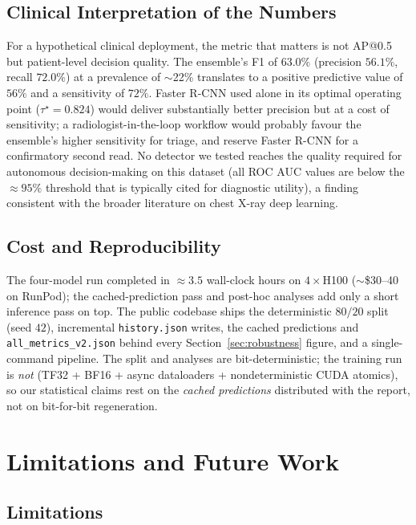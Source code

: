 \documentclass[11pt,a4paper]{article}
\begin{document}
\subsection{Clinical Interpretation of the Numbers}
For a hypothetical clinical deployment, the metric that matters is not AP@0.5 but patient-level decision quality. The ensemble's F1 of $63.0\%$ (precision $56.1\%$, recall $72.0\%$) at a prevalence of $\sim$22\% translates to a positive predictive value of $56\%$ and a sensitivity of $72\%$. Faster R-CNN used alone in its optimal operating point ($\tau^\star = 0.824$) would deliver substantially better precision but at a cost of sensitivity; a radiologist-in-the-loop workflow would probably favour the ensemble's higher sensitivity for triage, and reserve Faster R-CNN for a confirmatory second read. No detector we tested reaches the quality required for autonomous decision-making on this dataset (all ROC AUC values are below the $\approx 95\%$ threshold that is typically cited for diagnostic utility), a finding consistent with the broader literature on chest X-ray deep learning.

\subsection{Cost and Reproducibility}
The four-model run completed in $\approx 3.5$ wall-clock hours on $4\!\times\!$H100 ($\sim$\$30--40 on RunPod); the cached-prediction pass and post-hoc analyses add only a short inference pass on top. The public codebase ships the deterministic $80/20$ split (seed $42$), incremental \texttt{history.json} writes, the cached predictions and \texttt{all\_metrics\_v2.json} behind every Section~\ref{sec:robustness} figure, and a single-command pipeline. The split and analyses are bit-deterministic; the training run is \emph{not} (TF32 + BF16 + async dataloaders + nondeterministic CUDA atomics), so our statistical claims rest on the \emph{cached predictions} distributed with the report, not on bit-for-bit regeneration.

\pagebreak

\section{Limitations and Future Work}
\label{sec:limitations}

\subsection{Limitations}
\end{document}

